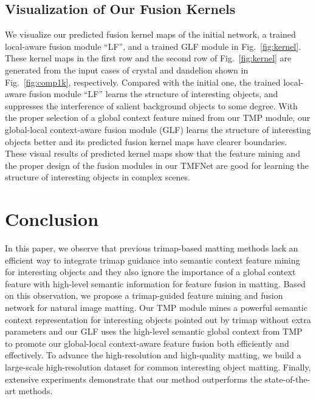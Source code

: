 \documentclass[10pt,twocolumn,letterpaper]{article}
\begin{document}
\subsection{Visualization of Our Fusion Kernels}
We visualize our predicted fusion kernel maps of the initial network, a trained local-aware fusion module ``LF'', and a trained GLF module in Fig.~\ref{fig:kernel}. These kernel maps in the first row and the second row of Fig.~\ref{fig:kernel} are generated from the input cases of crystal and dandelion shown in Fig.~\ref{fig:comp1k}, respectively. Compared with the initial one, the trained local-aware fusion module  ``LF'' learns the structure of interesting objects, and  suppresses the interference of salient background objects to some degree. With the proper selection of a global context feature mined from our TMP module, our global-local context-aware fusion module (GLF) learns the structure of interesting objects better and its predicted fusion kernel maps have clearer boundaries. These visual results of predicted kernel maps show that the feature mining and the proper design of the fusion modules in our TMFNet are good for learning the structure of interesting objects in complex scenes.

\section{Conclusion}
In this paper, we observe that previous trimap-based matting methods lack an efficient way to integrate trimap guidance into semantic context feature mining for interesting objects and they also ignore the importance of a global context feature with high-level semantic information for feature fusion in matting. Based on this observation, we propose a trimap-guided feature mining and fusion network for  natural image matting. Our TMP module mines a powerful semantic context representation for interesting objects pointed out by trimap without extra parameters and our GLF uses the high-level semantic global context from TMP to promote our global-local context-aware feature fusion both efficiently and effectively. To advance the high-resolution and high-quality matting, we build a large-scale high-resolution dataset for common interesting object matting. Finally, extensive experiments demonstrate that our method outperforms the state-of-the-art methods.

\newpage
{\small}

\clearpage
\newpage
\appendix
\end{document}
